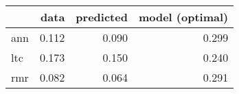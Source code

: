 \begin{tabular}{lrrr}
\toprule
{} &   data &  predicted &  model (optimal) \\
\midrule
ann &  0.112 &      0.090 &            0.299 \\
ltc &  0.173 &      0.150 &            0.240 \\
rmr &  0.082 &      0.064 &            0.291 \\
\bottomrule
\end{tabular}
